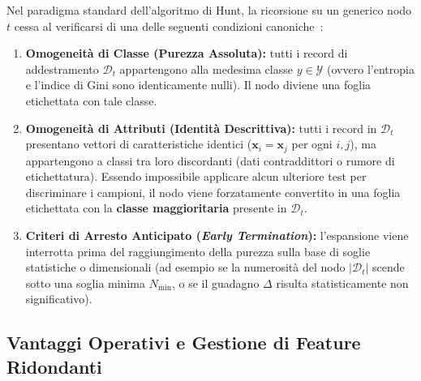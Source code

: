 Nel paradigma standard dell'algoritmo di Hunt, la ricorsione su un generico nodo $t$ cessa al verificarsi di una delle seguenti condizioni canoniche~\cite{tan2018, quinlan1993}:
\begin{enumerate}
    \item \textbf{Omogeneità di Classe (Purezza Assoluta):} tutti i record di addestramento $\mathcal{D}_t$ appartengono alla medesima classe $y \in \mathcal{Y}$ (ovvero l'entropia e l'indice di Gini sono identicamente nulli). Il nodo diviene una foglia etichettata con tale classe.
    \item \textbf{Omogeneità di Attributi (Identità Descrittiva):} tutti i record in $\mathcal{D}_t$ presentano vettori di caratteristiche identici ($\mathbf{x}_i = \mathbf{x}_j$ per ogni $i, j$), ma appartengono a classi tra loro discordanti (dati contraddittori o rumore di etichettatura). Essendo impossibile applicare alcun ulteriore test per discriminare i campioni, il nodo viene forzatamente convertito in una foglia etichettata con la \textbf{classe maggioritaria} presente in $\mathcal{D}_t$.
    \item \textbf{Criteri di Arresto Anticipato (\textit{Early Termination}):} l'espansione viene interrotta prima del raggiungimento della purezza sulla base di soglie statistiche o dimensionali (ad esempio se la numerosità del nodo $|\mathcal{D}_t|$ scende sotto una soglia minima $N_{\min}$, o se il guadagno $\Delta$ risulta statisticamente non significativo).
\end{enumerate}

\FloatBarrier
\subsection{Vantaggi Operativi e Gestione di Feature Ridondanti}
\label{subsec:dm-tree-advantages-features}

